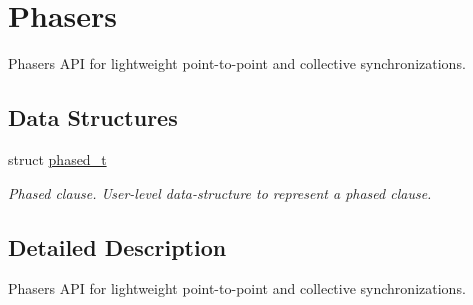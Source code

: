 \hypertarget{group__Phasers}{\section{Phasers}
\label{group__Phasers}
}


Phasers A\-P\-I for lightweight point-\/to-\/point and collective synchronizations.  


\subsection*{Data Structures}
\begin{DoxyCompactItemize}
\item 
struct \hyperlink{structphased__t}{phased\-\_\-t}
\begin{DoxyCompactList}\small\item\em Phased clause. User-\/level data-\/structure to represent a phased clause. \end{DoxyCompactList}\end{DoxyCompactItemize}


\subsection{Detailed Description}
Phasers A\-P\-I for lightweight point-\/to-\/point and collective synchronizations. 